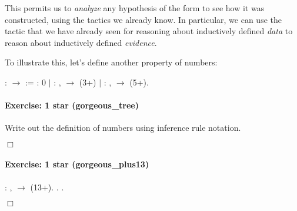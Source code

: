 \documentclass[12pt]{report}
\begin{document}
\subsubsection{ }

 This permits us to \textit{analyze} any hypothesis of the form 
     to see how it was constructed, using the tactics we already
    know.  In particular, we can use the  tactic that we
    have already seen for reasoning about inductively defined \textit{data}
    to reason about inductively defined \textit{evidence}.


    To illustrate this, let's define another property of numbers: \begin{coqdoccode}
\coqdocemptyline
\coqdocnoindent
{}  :  \ensuremath{\rightarrow}  :=\coqdoceol
\coqdocindent{1.00em}
 :  0\coqdoceol
\coqdocnoindent
\ensuremath{|}  : \coqdockw{\ensuremath{\forall}} ,   \ensuremath{\rightarrow}  (3+)\coqdoceol
\coqdocnoindent
\ensuremath{|}  : \coqdockw{\ensuremath{\forall}} ,   \ensuremath{\rightarrow}  (5+).\coqdoceol
\coqdocemptyline
\end{coqdoccode}
\paragraph{Exercise: 1 star (gorgeous\_tree)}

 Write out the definition of  numbers using inference rule
    notation.


\ensuremath{\Box}


\paragraph{Exercise: 1 star (gorgeous\_plus13)}

\begin{coqdoccode}
\coqdocnoindent
{} : \coqdockw{\ensuremath{\forall}} , \coqdoceol
\coqdocindent{1.00em}
  \ensuremath{\rightarrow}  (13+).\coqdoceol
\coqdocnoindent
{}.\coqdoceol
 .\coqdoceol
\end{coqdoccode}
\ensuremath{\Box} 
\end{document}
